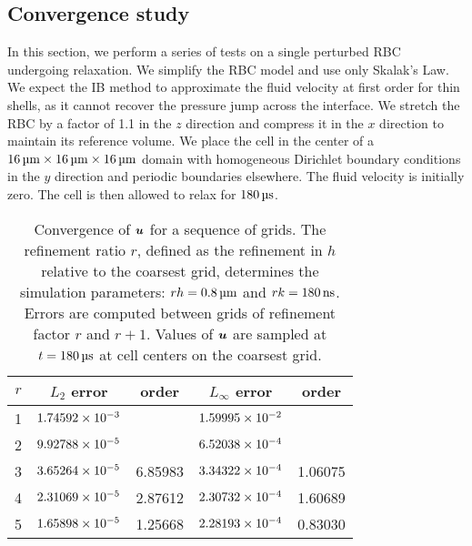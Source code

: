 \subsection{Convergence study}\label{sec:convergence}

In this section, we perform a series of tests on a single perturbed RBC undergoing
relaxation. We simplify the RBC model and use only Skalak's Law. We expect the IB method
to approximate the fluid velocity at first order for thin shells, as it cannot recover
the pressure jump across the interface. We stretch the RBC by a factor of 1.1 in the $z$
direction and compress it in the $x$ direction to maintain its reference volume. We place
the cell in the center of a $16\um\times16\um\times16\um$ domain with homogeneous
Dirichlet boundary conditions in the $y$ direction and periodic boundaries elsewhere. The
fluid velocity is initially zero. The cell is then allowed to relax for $180\us$.

\begin{table}[t!]
    \centering
    \caption[Convergence of fluid velocities for relaxing RBC test]{%
Convergence of $\boldsymbol{u}$ for a sequence of grids. The refinement ratio $r$, defined as the
refinement in $h$ relative to the coarsest grid, determines the simulation parameters:
$rh = 0.8\um$ and $r\timestep = 180\ns$. Errors are computed between grids of refinement
factor $r$ and $r+1$. Values of $\boldsymbol{u}$ are sampled at $t = 180\us$ at cell centers on the
coarsest grid.
    }\label{tab:u-rbc-conv}
    \begingroup
    \setlength{\tabcolsep}{9pt}
    \renewcommand{\arraystretch}{1.5}
    \begin{tabular}{c|cc|cc}
                                                                                     \toprule
        $r$ & $L_2$ error            & order   & $L_\infty$ error       & order   \\ \midrule
        1   & ${1.74592}\times 10^{-3}$ &         & ${1.59995}\times 10^{-2}$ &         \\
        2   & ${9.92788}\times 10^{-5}$ &         & ${6.52038}\times 10^{-4}$ &         \\
        3   & ${3.65264}\times 10^{-5}$ & 6.85983 & ${3.34322}\times 10^{-4}$ & 1.06075 \\
        4   & ${2.31069}\times 10^{-5}$ & 2.87612 & ${2.30732}\times 10^{-4}$ & 1.60689 \\
        5   & ${1.65898}\times 10^{-5}$ & 1.25668 & ${2.28193}\times 10^{-4}$ & 0.83030 \\ \bottomrule
    \end{tabular}
    \endgroup
\end{table}

